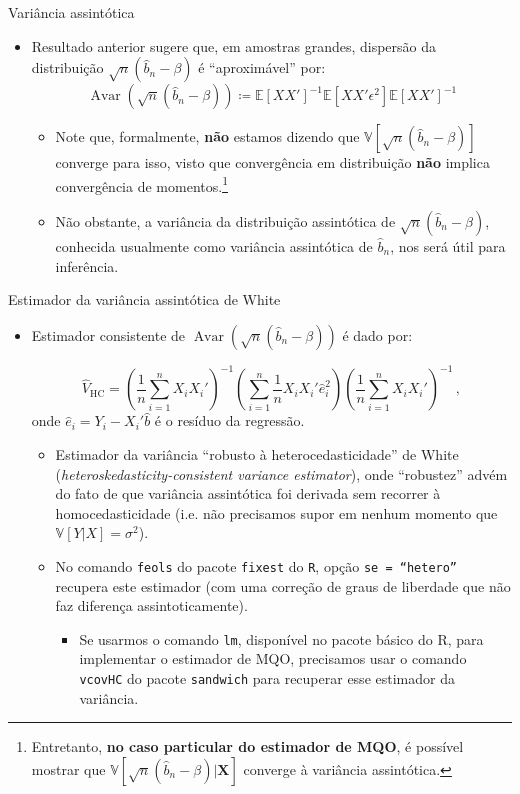 \documentclass[11pt]{beamer}
\begin{document}
	\begin{frame}{Variância assintótica}
		\begin{itemize}
			\item Resultado anterior sugere que, em amostras grandes, dispersão da distribuição $\sqrt{n}(\hat{b}_n - \beta) $ é ``aproximável'' por: 
			$$\operatorname{Avar}(\sqrt{n}(\hat{b}_n - \beta))\coloneqq\mathbb{E}[XX']^{-1}\mathbb{E}[XX'\epsilon^2]\mathbb{E}[XX']^{-1}$$
			\vspace{-0.5em}
			\begin{itemize}
				\item Note que, formalmente, \textbf{não} estamos dizendo que $\mathbb{V}\left[\sqrt{n}(\hat{b}_n - \beta) \right]$ converge para isso, visto que convergência em distribuição \textbf{não} implica convergência de momentos.\footnote{Entretanto, \textbf{no caso particular do estimador de MQO}, é possível mostrar que $\mathbb{V}\left[\sqrt{n}(\hat{b}_n - \beta)|\boldsymbol{X}\right]$ converge à variância assintótica.}
				\item Não obstante, a variância da distribuição assintótica de $\sqrt{n}(\hat{b}_n - \beta)$, conhecida usualmente como {\color{blue}variância assintótica de $\hat{b}_n$}, nos será útil para inferência.
			\end{itemize}
		\end{itemize}
	\end{frame}
	\begin{frame}{Estimador da variância assintótica de White}
\begin{itemize}
	 			\item Estimador consistente de $\operatorname{Avar}(\sqrt{n}(\hat{b}_n - \beta))$ é dado por:
	
	$$\hat{V}_{\text{HC}} = \left(\frac{1}{n}\sum_{i=1}^n X_i X_i'\right)^{-1}\left(\sum_{i=1}^n\frac{1}{n} X_i X_i' \hat{e}_i^2\right) \left(\frac{1}{n}\sum_{i=1}^n X_i X_i'\right)^{-1}\, ,$$
	onde $\hat{e}_i = Y_i - X_i'\hat{b}$ é o resíduo da regressão.
	\begin{itemize}
		\item Estimador da variância ``{\color{blue}robusto à heterocedasticidade}'' de White (\textit{heteroskedasticity-consistent variance estimator}),  onde ``robustez'' advém do fato de que variância assintótica foi derivada sem recorrer à homocedasticidade (i.e. não precisamos supor em nenhum momento que $\mathbb{V}[Y|X] =\sigma^2$).
		\item No comando \texttt{feols} do pacote \texttt{fixest} do \texttt{R}, opção \texttt{se = ``hetero''} recupera este estimador (com uma correção de graus de liberdade que não faz diferença assintoticamente).
		\begin{itemize}
			\item Se usarmos o comando \texttt{lm}, disponível no pacote básico do R, para implementar o estimador de MQO, precisamos usar o comando \texttt{vcovHC} do pacote \texttt{sandwich} para recuperar esse estimador da variância.
		\end{itemize}
	\end{itemize}
\end{itemize}
	\end{frame}
	
\end{document}
